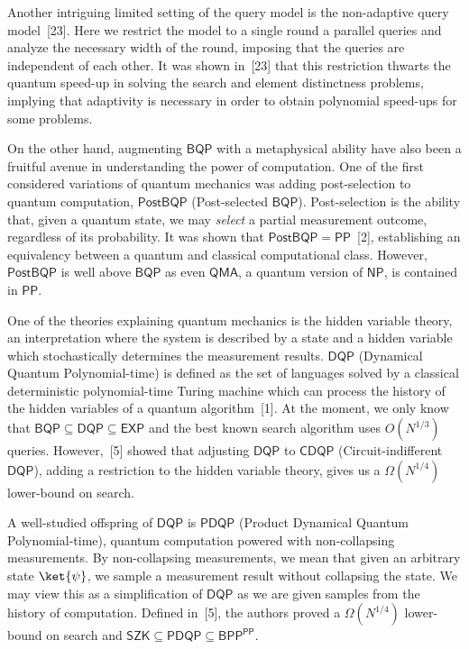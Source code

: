 Another intriguing limited setting of the query model is the non-adaptive query model [23]. Here we restrict the model to a single round a parallel queries and analyze the necessary width of the round, imposing that the queries are independent of each other. It was shown in [23] that this restriction thwarts the quantum speed-up in solving the search and element distinctness problems, implying that adaptivity is necessary in order to obtain polynomial speed-ups for some problems.\par




On the other hand, augmenting $\mathsf{BQP}$ with a metaphysical ability have also been a fruitful avenue in understanding the power of computation.
One of the first considered variations of quantum mechanics was adding post-selection to quantum computation, $\mathsf{PostBQP}$ (Post-selected $\mathsf{BQP}$). Post-selection is the ability that, given a quantum state, we may \emph{select} a partial measurement outcome, regardless of its probability. It was shown that $\mathsf{PostBQP}=\mathsf{PP}$ [2], establishing an equivalency between a quantum and classical computational class. However, $\mathsf{PostBQP}$ is well above $\mathsf{BQP}$ as even $\mathsf{QMA}$, a quantum version of $\mathsf{NP}$, is contained in $\mathsf{PP}$.\par




One of the theories explaining quantum mechanics is the hidden variable theory, an interpretation where the system is described by a state and a hidden variable which stochastically determines the measurement results. $\mathsf{DQP}$ (Dynamical Quantum Polynomial-time) is defined as the set of languages solved by a classical deterministic polynomial-time Turing machine which can process the history of the hidden variables of a quantum algorithm [1]. At the moment, we only know that $\mathsf{BQP}\subseteq\mathsf{DQP}\subseteq\mathsf{EXP}$ and the best known search algorithm uses $O(N^{1/3})$ queries. However, [5] showed that adjusting $\mathsf{DQP}$ to $\mathsf{CDQP}$ (Circuit-indifferent $\mathsf{DQP}$), adding a restriction to the hidden variable theory, gives us a $\Omega(N^{1/4})$ lower-bound on search.\par




A well-studied offspring of $\mathsf{DQP}$ is $\mathsf{PDQP}$ (Product Dynamical Quantum Polynomial-time), quantum computation powered with non-collapsing measurements. By non-collapsing measurements, we mean that given an arbitrary state $\ket{\psi}$, we sample a measurement result without collapsing the state.
We may view this as a simplification of $\mathsf{DQP}$ as we are given samples from the history of computation. Defined in [5], the authors proved a $\Omega(N^{1/4})$ lower-bound on search and $\mathsf{SZK}\subseteq\mathsf{PDQP}\subseteq\mathsf{BPP}^{\mathsf{PP}}$.\par




